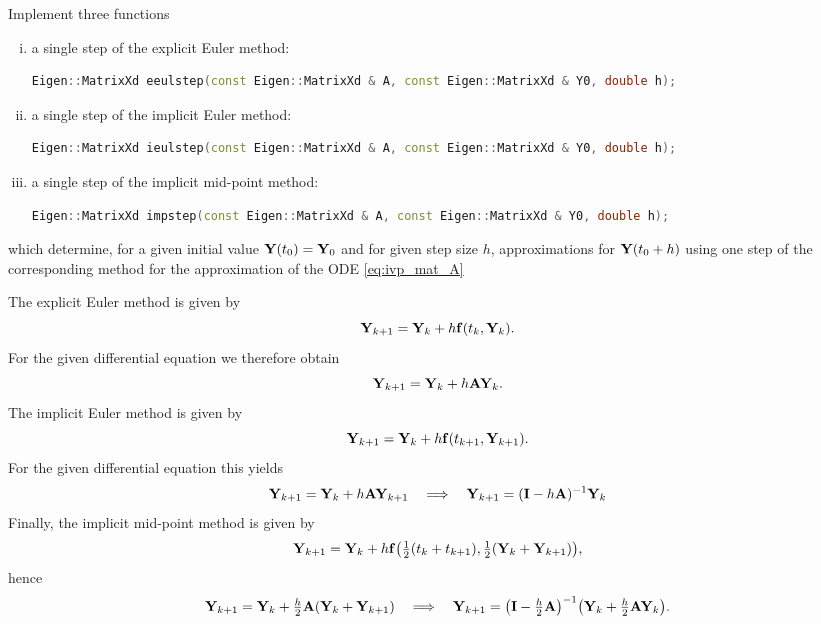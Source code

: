 \begin{problem}
\begin{subproblem}[1] \label{sp:implement}
Implement three \Cpp{} functions
\begin{enumerate}[(i)]
  	\item a single step of the explicit Euler method: %
\begin{lstlisting}[language=c++]
Eigen::MatrixXd eeulstep(const Eigen::MatrixXd & A, const Eigen::MatrixXd & Y0, double h);
\end{lstlisting}
  	\item a single step of the implicit Euler method: %
\begin{lstlisting}[language=c++]
Eigen::MatrixXd ieulstep(const Eigen::MatrixXd & A, const Eigen::MatrixXd & Y0, double h);
\end{lstlisting}
  	\item a single step of the implicit mid-point method: %
\begin{lstlisting}[language=c++]
Eigen::MatrixXd impstep(const Eigen::MatrixXd & A, const Eigen::MatrixXd & Y0, double h); 
\end{lstlisting}
\end{enumerate}
which determine, for a given initial value ${\mathbf{Y}}(t_0) = {\mathbf{Y}}_0$ and for given step size $h$, approximations for ${\mathbf{Y}}(t_0+h)$ using one step of the corresponding method for the approximation of the ODE \eqref{eq:ivp_mat_A}

\begin{solution}
The explicit Euler method is given by 
\begin{equation*}
		{\mathbf{Y}}_{k+1} = {\mathbf{Y}}_k + h {\mathbf{f}}(t_k, {\mathbf{Y}}_k).
\end{equation*}
For the given differential equation we therefore obtain 
\begin{equation*}
	{\mathbf{Y}}_{k+1} = {\mathbf{Y}}_k + h {\mathbf{A}}{\mathbf{Y}}_k.
\end{equation*}
The implicit Euler method is given by
\begin{equation*}
		{\mathbf{Y}}_{k+1} = {\mathbf{Y}}_k + h {\mathbf{f}}(t_{k+1}, {\mathbf{Y}}_{k+1}).
\end{equation*}
For the given differential equation this yields
\begin{equation*}
	{\mathbf{Y}}_{k+1} = {\mathbf{Y}}_k + h {\mathbf{A}}{\mathbf{Y}}_{k+1}
	\quad \Longrightarrow \quad
	{\mathbf{Y}}_{k+1} = ({\mathbf{I}} - h {\mathbf{A}})^{-1} {\mathbf{Y}}_k
\end{equation*}
Finally, the implicit mid-point method is given by
\begin{equation*}
	{\mathbf{Y}}_{k+1} = {\mathbf{Y}}_k + h {\mathbf{f}}\bigl(\tfrac{1}{2}(t_k + t_{k+1}), \tfrac{1}{2} ({\mathbf{Y}}_k + {\mathbf{Y}}_{k+1})\bigr),
\end{equation*}
hence
\begin{equation*}
	{\mathbf{Y}}_{k+1} = {\mathbf{Y}}_k + \tfrac{h}{2} {\mathbf{A}} ({\mathbf{Y}}_k + {\mathbf{Y}}_{k+1})
	\quad \Longrightarrow \quad
	{\mathbf{Y}}_{k+1} = \bigl({\mathbf{I}} - \tfrac{h}{2} {\mathbf{A}}\bigr)^{-1} \bigl({\mathbf{Y}}_k + \tfrac{h}{2} {\mathbf{A}} {\mathbf{Y}}_k\bigr).
\end{equation*}
\end{solution}
\end{subproblem}


\end{problem}
